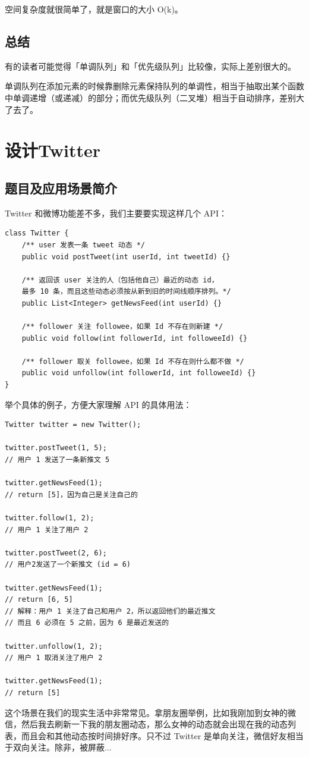 \documentclass[12pt]{article}
\begin{document}
空间复杂度就很简单了，就是窗口的大小 O(k)。

\subsection{总结}
有的读者可能觉得「单调队列」和「优先级队列」比较像，实际上差别很大的。

单调队列在添加元素的时候靠删除元素保持队列的单调性，相当于抽取出某个函数中单调递增（或递减）的部分；而优先级队列（二叉堆）相当于自动排序，差别大了去了。

\section{设计Twitter}
\subsection{题目及应用场景简介}
Twitter 和微博功能差不多，我们主要要实现这样几个 API：
\begin{lstlisting}
class Twitter {
    /** user 发表一条 tweet 动态 */
    public void postTweet(int userId, int tweetId) {}
    
    /** 返回该 user 关注的人（包括他自己）最近的动态 id，
    最多 10 条，而且这些动态必须按从新到旧的时间线顺序排列。*/
    public List<Integer> getNewsFeed(int userId) {}
    
    /** follower 关注 followee，如果 Id 不存在则新建 */
    public void follow(int followerId, int followeeId) {}
    
    /** follower 取关 followee，如果 Id 不存在则什么都不做 */
    public void unfollow(int followerId, int followeeId) {}
}
\end{lstlisting}

举个具体的例子，方便大家理解 API 的具体用法：
\begin{lstlisting}
Twitter twitter = new Twitter();

twitter.postTweet(1, 5);
// 用户 1 发送了一条新推文 5

twitter.getNewsFeed(1);
// return [5]，因为自己是关注自己的

twitter.follow(1, 2);
// 用户 1 关注了用户 2

twitter.postTweet(2, 6);
// 用户2发送了一个新推文 (id = 6)

twitter.getNewsFeed(1);
// return [6, 5]
// 解释：用户 1 关注了自己和用户 2，所以返回他们的最近推文
// 而且 6 必须在 5 之前，因为 6 是最近发送的

twitter.unfollow(1, 2);
// 用户 1 取消关注了用户 2

twitter.getNewsFeed(1);
// return [5]
\end{lstlisting}
这个场景在我们的现实生活中非常常见。拿朋友圈举例，比如我刚加到女神的微信，然后我去刷新一下我的朋友圈动态，那么女神的动态就会出现在我的动态列表，而且会和其他动态按时间排好序。只不过 Twitter 是单向关注，微信好友相当于双向关注。除非，被屏蔽...
\end{document}
